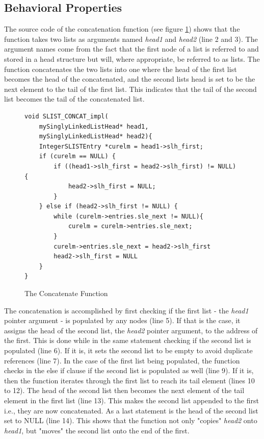 \subsection{Behavioral Properties}

The source code of the concatenation function (see figure \ref{fig:concat}) shows that the function takes two lists as arguments named \textit{head1} and \textit{head2} (line 2 and 3). The argument names come from the fact that the first node of a list is referred to and stored in a head structure but will, where appropriate, be referred to as lists. The function concatenates the two lists into one where the head of the first list becomes the head of the concatenated, and the second lists head is set to be the next element to the tail of the first list. This indicates that the tail of the second list becomes the tail of the concatenated list.
\begin{figure}[H]
 \vspace{12pt}
\begin{lstlisting}[style=CSTYLE, belowskip=1pt]
void SLIST_CONCAT_impl(
    mySinglyLinkedListHead* head1, 
    mySinglyLinkedListHead* head2){
    IntegerSLISTEntry *curelm = head1->slh_first;
    if (curelm == NULL) {                                    
        if ((head1->slh_first = head2->slh_first) != NULL) {
            head2->slh_first = NULL;                                   
        }
    } else if (head2->slh_first != NULL) {               
        while (curelm->entries.sle_next != NULL){  
            curelm = curelm->entries.sle_next;         
        }                                                                                                              
        curelm->entries.sle_next = head2->slh_first
        head2->slh_first = NULL
    }
}
\end{lstlisting}
    \caption{The Concatenate Function}
    \label{fig:concat}
\end{figure}
The concatenation is accomplished by first checking if the first list - the \textit{head1} pointer argument - is populated by any nodes (line 5). If that is the case, it assigns the head of the second list, the \textit{head2} pointer argument, to the address of the first. This is done while in the same statement checking if the second list is populated (line 6). If it is, it sets the second list to be empty to avoid duplicate references (line 7). 
In the case of the first list being populated, the function checks in the else if clause if the second list is populated as well (line 9). If it is, then the function iterates through the first list to reach its tail element (lines 10 to 12). The head of the second list then becomes the next element of the tail element in the first list (line 13). This makes the second list appended to the first i.e., they are now concatenated. As a last statement is the head of the second list set to NULL (line 14). This shows that the function not only "copies" \textit{head2} onto \textit{head1}, but "moves" the second list onto the end of the first.


